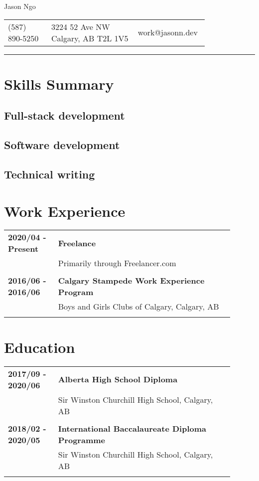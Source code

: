 \documentclass[letterpaper]{article}
\begin{document}
    \begin{center}
        \Large
        Jason Ngo

        \normalsize
        \begin{tabular}{m{0.2\linewidth}m{0.4\linewidth}m{0.2\linewidth}}
            (587) 890-5250 &
            3224 52 Ave NW Calgary, AB T2L 1V5 &
            work@jasonn.dev
        \end{tabular}
        \rule{\linewidth}{0.4pt}
    \end{center}

    \section*{Skills Summary}
        \subsection*{Full-stack development}
        \subsection*{Software development}
        \subsection*{Technical writing}

    \section*{Work Experience}
        \begin{tabular}{p{0.2\linewidth}p{0.7\linewidth}} 
            \textbf{2020/04 - Present} & \large\textbf{Freelance} \\
            & Primarily through Freelancer.com \\
            \\
            \textbf{2016/06 - 2016/06} & \large\textbf{Calgary Stampede Work Experience Program} \\
            & Boys and Girls Clubs of Calgary, Calgary, AB \\
            \\
        \end{tabular}

    \section*{Education}
        \begin{tabular}{p{0.2\linewidth}p{0.7\linewidth}} 
            \textbf{2017/09 - 2020/06} & \large\textbf{Alberta High School Diploma} \\
            & Sir Winston Churchill High School, Calgary, AB \\
            \\
            \textbf{2018/02 - 2020/05} & \large\textbf{International Baccalaureate Diploma Programme} \\
            & Sir Winston Churchill High School, Calgary, AB \\
            \\
        \end{tabular}
\end{document}

